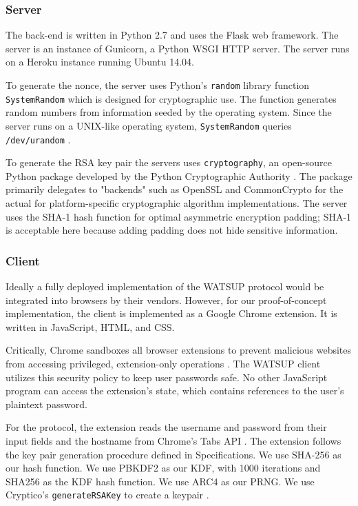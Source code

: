 \subsubsection{Server}

The back-end is written in Python 2.7 and uses the Flask web framework. The server is an instance of Gunicorn, a Python WSGI HTTP server. The server runs on a Heroku instance running Ubuntu 14.04.

To generate the nonce, the server uses Python's \texttt{random} library function \texttt{SystemRandom} which is designed for cryptographic use. The function generates random numbers from information seeded by the operating system. Since the server runs on a UNIX-like operating system, \texttt{SystemRandom} queries \texttt{/dev/urandom} \cite{Python:2017:SystemRandom, Python:2017:urandom}.

To generate the RSA key pair the servers uses \texttt{cryptography}, an open-source Python package developed by the Python Cryptographic Authority \cite{PCA:2017}. The package primarily delegates to "backends" such as OpenSSL and CommonCrypto for the actual for platform-specific cryptographic algorithm implementations. The server uses the SHA-1 hash function for optimal asymmetric encryption padding; SHA-1 is acceptable here because adding padding does not hide sensitive information.

\subsubsection{Client}

Ideally a fully deployed implementation of the WATSUP protocol would be integrated into browsers by their vendors. However, for our proof-of-concept implementation, the client is implemented as a Google Chrome extension. It is written in JavaScript, HTML, and CSS.

Critically, Chrome sandboxes all browser extensions to prevent malicious websites from accessing privileged, extension-only operations \cite{Google:2017:contentSecurityPolicy}. The WATSUP client utilizes this security policy to keep user passwords safe. No other JavaScript program can access the extension's state, which contains references to the user's plaintext password.

For the protocol, the extension reads the username and password from their input fields and the hostname from Chrome's Tabs API \cite{Google:2017:tabs}. The extension follows the key pair generation procedure defined in Specifications. We use SHA-256 as our hash function. We use PBKDF2 as our KDF, with 1000 iterations and SHA256 as the KDF hash function. We use ARC4 as our PRNG. We use Cryptico's \texttt{generateRSAKey} to create a keypair \cite{Terrell:2017}.

